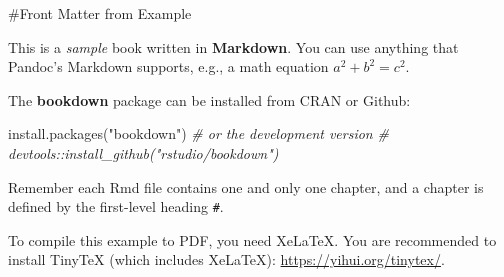 \documentclass[
]{book}
\newenvironment{Shaded}{\begin{snugshade}}{\end{snugshade}}
\newcommand{\CommentTok}[1]{\textcolor[rgb]{0.56,0.35,0.01}{\textit{#1}}}
\newcommand{\FunctionTok}[1]{\textcolor[rgb]{0.00,0.00,0.00}{#1}}
\newcommand{\NormalTok}[1]{#1}
\newcommand{\StringTok}[1]{\textcolor[rgb]{0.31,0.60,0.02}{#1}}
\begin{document}
\#Front Matter from Example

This is a \emph{sample} book written in \textbf{Markdown}. You can use anything that Pandoc's Markdown supports, e.g., a math equation \(a^2 + b^2 = c^2\).

The \textbf{bookdown} package can be installed from CRAN or Github:

\begin{Shaded}
\begin{Highlighting}[]
\FunctionTok{install.packages}\NormalTok{(}\StringTok{"bookdown"}\NormalTok{)}
\CommentTok{\# or the development version}
\CommentTok{\# devtools::install\_github("rstudio/bookdown")}
\end{Highlighting}
\end{Shaded}

Remember each Rmd file contains one and only one chapter, and a chapter is defined by the first-level heading \texttt{\#}.

To compile this example to PDF, you need XeLaTeX. You are recommended to install TinyTeX (which includes XeLaTeX): \url{https://yihui.org/tinytex/}.

  
\end{document}

